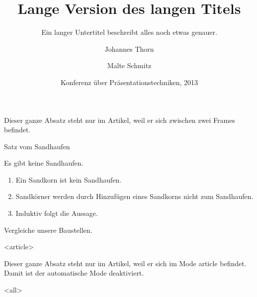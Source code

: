 \usepackage[utf8]{inputenc}
\usepackage[T1]{fontenc}
\usepackage{lmodern}

\usepackage[ngerman]{babel}

\title[Kurztitel]{%
  Lange Version des langen Titels}

\subtitle{Ein langer Untertitel beschreibt
  alles noch etwas genauer.}

\author[Thorn, Schmitz]{%
  Johannes Thorn \and Malte Schmitz}

\date[KPT 2013]{Konferenz über
  Präsentationstechniken, 2013}


  \mode*

  \begin{frame}
    \maketitle
  \end{frame}

  Dieser ganze Absatz steht nur im Artikel,
  weil er sich zwischen zwei Frames befindet.

  \begin{frame}{Satz vom Sandhaufen}
    \begin{Satz}[Sandhaufensatz]
      Es gibt keine Sandhaufen.
    \end{Satz}

    \begin{Beweis}
      \begin{enumerate}
        \item Ein Sandkorn ist kein Sandhaufen.
        \item Sandkörner werden durch Hinzufügen
          eines Sandkorns nicht zum Sandhaufen.
        \item Induktiv folgt die Aussage. \qedhere
      \end{enumerate}
    \end{Beweis}

    \begin{Beispiel}
      Vergleiche unsere Baustellen.

    \end{Beispiel}
  \end{frame}

  \mode
  <article>

  Dieser ganze Absatz steht nur im Artikel,
  weil er sich im Mode article befindet.
  Damit ist der automatische Mode deaktiviert.

  \mode
  <all>
